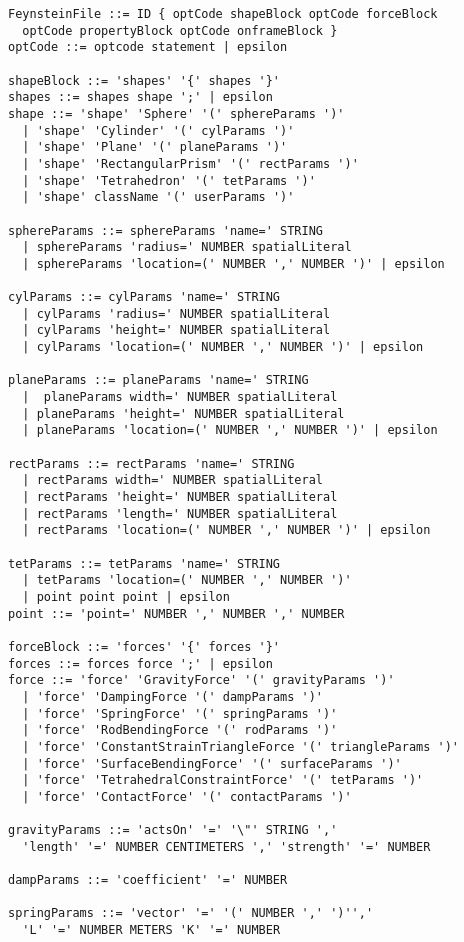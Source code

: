 \documentclass[letterpaper]{article}
\begin{document}
\begin{verbatim}
FeynsteinFile ::= ID { optCode shapeBlock optCode forceBlock 
  optCode propertyBlock optCode onframeBlock }
optCode ::= optcode statement | epsilon

shapeBlock ::= 'shapes' '{' shapes '}'
shapes ::= shapes shape ';' | epsilon
shape ::= 'shape' 'Sphere' '(' sphereParams ')' 
  | 'shape' 'Cylinder' '(' cylParams ')' 
  | 'shape' 'Plane' '(' planeParams ')' 
  | 'shape' 'RectangularPrism' '(' rectParams ')' 
  | 'shape' 'Tetrahedron' '(' tetParams ')' 
  | 'shape' className '(' userParams ')' 

sphereParams ::= sphereParams 'name=' STRING 
  | sphereParams 'radius=' NUMBER spatialLiteral 
  | sphereParams 'location=(' NUMBER ',' NUMBER ')' | epsilon

cylParams ::= cylParams 'name=' STRING 
  | cylParams 'radius=' NUMBER spatialLiteral 
  | cylParams 'height=' NUMBER spatialLiteral 
  | cylParams 'location=(' NUMBER ',' NUMBER ')' | epsilon

planeParams ::= planeParams 'name=' STRING 
  |  planeParams width=' NUMBER spatialLiteral 
  | planeParams 'height=' NUMBER spatialLiteral 
  | planeParams 'location=(' NUMBER ',' NUMBER ')' | epsilon

rectParams ::= rectParams 'name=' STRING 
  | rectParams width=' NUMBER spatialLiteral 
  | rectParams 'height=' NUMBER spatialLiteral 
  | rectParams 'length=' NUMBER spatialLiteral 
  | rectParams 'location=(' NUMBER ',' NUMBER ')' | epsilon

tetParams ::= tetParams 'name=' STRING 
  | tetParams 'location=(' NUMBER ',' NUMBER ')' 
  | point point point | epsilon 
point ::= 'point=' NUMBER ',' NUMBER ',' NUMBER 

forceBlock ::= 'forces' '{' forces '}'
forces ::= forces force ';' | epsilon
force ::= 'force' 'GravityForce' '(' gravityParams ')' 
  | 'force' 'DampingForce '(' dampParams ')' 
  | 'force' 'SpringForce' '(' springParams ')' 
  | 'force' 'RodBendingForce '(' rodParams ')' 
  | 'force' 'ConstantStrainTriangleForce '(' triangleParams ')' 
  | 'force' 'SurfaceBendingForce' '(' surfaceParams ')' 
  | 'force' 'TetrahedralConstraintForce' '(' tetParams ')' 
  | 'force' 'ContactForce' '(' contactParams ')' 

gravityParams ::= 'actsOn' '=' '\"' STRING ',' 
  'length' '=' NUMBER CENTIMETERS ',' 'strength' '=' NUMBER

dampParams ::= 'coefficient' '=' NUMBER

springParams ::= 'vector' '=' '(' NUMBER ',' ')'',' 
  'L' '=' NUMBER METERS 'K' '=' NUMBER


\end{verbatim}
\end{document}
